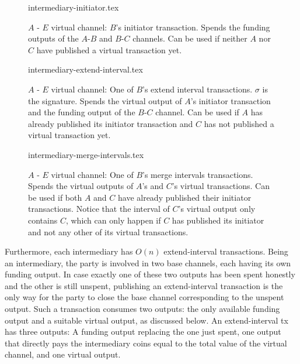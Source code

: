   \begin{figure}
    {intermediary-initiator.tex}
    \caption{$A$ - $E$ virtual channel: $B$'s initiator transaction. Spends the
    funding outputs of the $A$-$B$ and $B$-$C$ channels. Can be used if neither
    $A$ nor $C$ have published a virtual transaction yet.}
    \label{figure:virtual-layer-initiator}
  \end{figure}

  \begin{figure}
    {intermediary-extend-interval.tex}
    \caption{$A$ - $E$ virtual channel: One of $B$'s extend interval
    transactions. $\sigma$ is the signature. Spends the virtual output of $A$'s
    initiator transaction and the funding output of the $B$-$C$ channel. Can be
    used if $A$ has already published its initiator transaction and $C$ has not
    published a virtual transaction yet.}
    \label{figure:virtual-layer-extend-interval}
  \end{figure}

  \begin{figure}
    {intermediary-merge-intervals.tex}
    \caption{$A$ - $E$ virtual channel: One of $B$'s merge intervals
    transactions. Spends the virtual outputs of $A$'s and $C$'s virtual
    transactions. Can be used if both $A$ and $C$ have already published their
    initiator transactions. Notice that the interval of $C$'s virtual output
    only contains $C$, which can only happen if $C$ has published its initiator
    and not any other of its virtual transactions.}
    \label{figure:virtual-layer-merge-intervals}
  \end{figure}

  Furthermore, each intermediary has $O(n)$ extend-interval transactions.
  Being an intermediary, the party is involved in two base channels, each having
  its own funding output. In case exactly one of these two outputs has been spent
  honestly and the other is still unspent,
  publishing an extend-interval transaction is the only way for the party to
  close the base channel corresponding to the unspent output.
  Such a transaction consumes two outputs: the only
  available funding output and a suitable virtual output, as discussed below. An
  extend-interval tx has three outputs: A funding output replacing the one just
  spent, one output that directly pays the intermediary coins equal to the total
  value of the virtual channel, and one virtual output.

